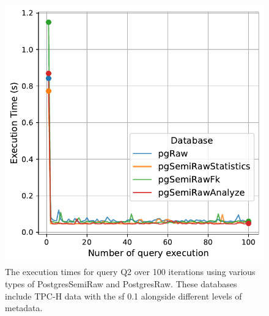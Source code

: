 \begin{figure}[hbt!]
\centering
\includegraphics[width=1.0\linewidth]{charts-eval-exp-time-stat/execution_time_db_type_Q2.pdf}
\caption[Q2:result]{The execution times for query Q2 over 100 iterations using various types of PostgresSemiRaw and PostgresRaw. These databases include TPC-H data with the \acrshort{sf} 0.1 alongside different levels of metadata.}
\label{fig:execution_time_db_type_Q2}
\end{figure}
